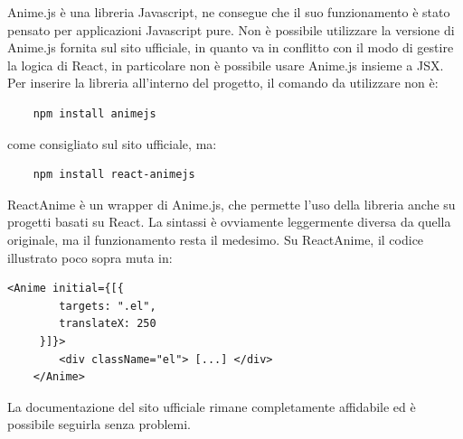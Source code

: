 \noindent Anime.js \cite{animejs} è una libreria Javascript, ne consegue che il suo funzionamento è stato pensato per applicazioni Javascript pure.\newline
Non è possibile utilizzare la versione di Anime.js fornita sul sito ufficiale, in quanto va in conflitto con il modo di gestire la logica di React, in particolare non è possibile usare Anime.js insieme a JSX.
Per inserire la libreria all'interno del progetto, il comando da utilizzare non è: \begin{verbatim}
    npm install animejs
\end{verbatim} come consigliato sul sito ufficiale, ma: \begin{verbatim}
    npm install react-animejs
\end{verbatim}
ReactAnime è un wrapper di Anime.js, che permette l'uso della libreria anche su progetti basati su React.
La sintassi è ovviamente leggermente diversa da quella originale, ma il funzionamento resta il medesimo.\newline
Su ReactAnime, il codice illustrato poco sopra muta in:
\begin{lstlisting}[language=HTML5]
    <Anime initial={[{
        targets: ".el",
        translateX: 250
     }]}>
        <div className="el"> [...] </div>
    </Anime>
\end{lstlisting}
La documentazione del sito ufficiale rimane completamente affidabile ed è possibile seguirla senza problemi.
